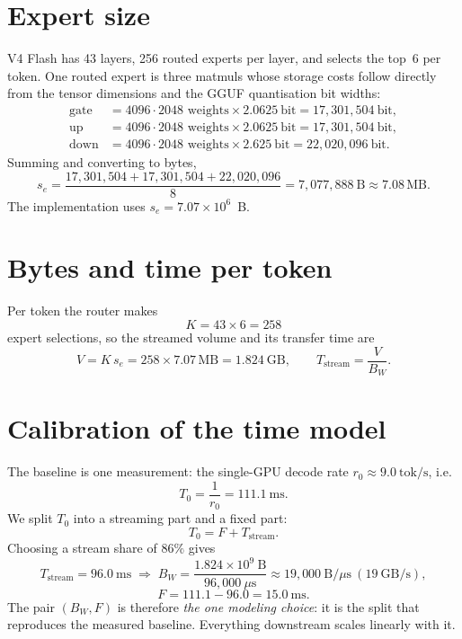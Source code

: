 \documentclass[11pt]{article}
\newcommand{\mb}{\,\mathrm{MB}}
\begin{document}
\section{Expert size}

V4 Flash has 43 layers, 256 routed experts per layer, and selects the top~6
per token. One routed expert is three matmuls whose storage costs follow
directly from the tensor dimensions and the GGUF quantisation bit widths:
\[
\begin{aligned}
\text{gate} &= 4096\cdot 2048 \text{ weights} \times 2.0625\ \text{bit}
            = 17{,}301{,}504\ \text{bit},\\
\text{up}   &= 4096\cdot 2048 \text{ weights} \times 2.0625\ \text{bit}
            = 17{,}301{,}504\ \text{bit},\\
\text{down} &= 4096\cdot 2048 \text{ weights} \times 2.625\ \text{bit}
            = 22{,}020{,}096\ \text{bit}.
\end{aligned}
\]
Summing and converting to bytes,
\[
s_e = \frac{17{,}301{,}504 + 17{,}301{,}504 + 22{,}020{,}096}{8}
    = 7{,}077{,}888\ \text{B} \approx 7.08\mb .
\]
The implementation uses $s_e = 7.07\times 10^{6}$~B.

\section{Bytes and time per token}

Per token the router makes
\[
K = 43 \times 6 = 258
\]
expert selections, so the streamed volume and its transfer time are
\[
V = K\,s_e = 258 \times 7.07\mb = 1.824\ \text{GB},
\qquad
T_{\text{stream}} = \frac{V}{B_W}.
\]

\section{Calibration of the time model}

The baseline is one measurement: the single-GPU decode rate
$r_0 \approx 9.0\ \text{tok/s}$, i.e.
\[
T_0 = \frac{1}{r_0} = 111.1\ \text{ms}.
\]
We split $T_0$ into a streaming part and a fixed part:
\[
T_0 = F + T_{\text{stream}}.
\]
Choosing a stream share of $86\%$ gives
\[
T_{\text{stream}} = 96.0\ \text{ms}
\;\Longrightarrow\;
B_W = \frac{1.824\times 10^{9}\ \text{B}}{96{,}000\ \mu\text{s}}
    \approx 19{,}000\ \text{B}/\mu\text{s}\ (19\ \text{GB/s}),
\]
\[
F = 111.1 - 96.0 = 15.0\ \text{ms}.
\]
The pair $(B_W, F)$ is therefore \emph{the one modeling choice}: it is the
split that reproduces the measured baseline. Everything downstream scales
linearly with it.
\end{document}
